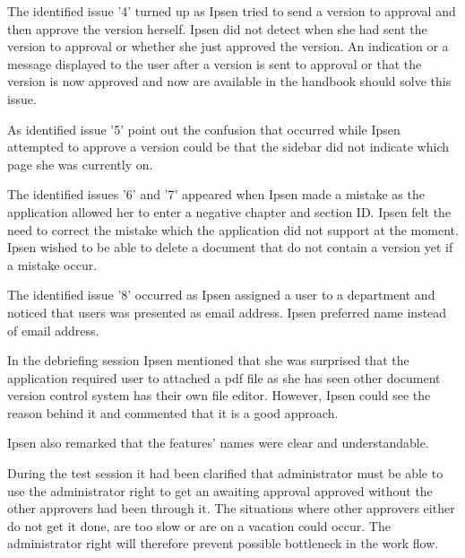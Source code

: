 The identified issue '4' turned up as Ipsen tried to send a version to approval and then  approve the version herself.
Ipsen did not detect when she had sent the version to approval or whether she just approved the version. 
An indication or a message displayed to the user after a version is sent to approval or that the version is now approved and now are available in the handbook should solve this issue.

As identified issue '5' point out the confusion that occurred while Ipsen attempted to approve a version could be that the sidebar did not indicate which page she was currently on. 

The identified issues '6' and '7' appeared when Ipsen made a mistake as the application allowed her to enter a negative chapter and section ID. 
Ipsen felt the need to correct the mistake which the application did not support at the moment.
Ipsen wished to be able to delete a document that do not contain a version yet if a mistake occur.

The identified issue '8' occurred as Ipsen assigned a user to a department and noticed that users was presented as email address.
Ipsen preferred name instead of email address.

In the debriefing session Ipsen mentioned that she was surprised that the application required user to attached a pdf file as she has seen other document version control system has their own file editor.
However, Ipsen could see the reason behind it and commented that it is a good approach.

Ipsen also remarked that the features' names were clear and understandable. 

During the test session it had been clarified that administrator must be able to use the administrator right to get an awaiting approval approved without the other approvers had been through it.
The situations where other approvers either do not get it done, are too slow or are on a vacation could occur. 
The administrator right will therefore prevent possible bottleneck in the work flow.

